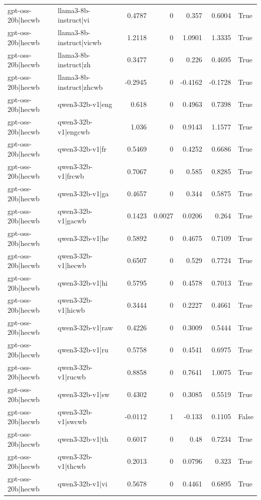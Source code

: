 \begin{table}
\begin{tabular}{l l r r r r l}
gpt-oss-20b|hecwb & llama3-8b-instruct|vi & 0.4787 & 0 & 0.357 & 0.6004 & True \\
gpt-oss-20b|hecwb & llama3-8b-instruct|vicwb & 1.2118 & 0 & 1.0901 & 1.3335 & True \\
gpt-oss-20b|hecwb & llama3-8b-instruct|zh & 0.3477 & 0 & 0.226 & 0.4695 & True \\
gpt-oss-20b|hecwb & llama3-8b-instruct|zhcwb & -0.2945 & 0 & -0.4162 & -0.1728 & True \\
gpt-oss-20b|hecwb & qwen3-32b-v1|eng & 0.618 & 0 & 0.4963 & 0.7398 & True \\
gpt-oss-20b|hecwb & qwen3-32b-v1|engcwb & 1.036 & 0 & 0.9143 & 1.1577 & True \\
gpt-oss-20b|hecwb & qwen3-32b-v1|fr & 0.5469 & 0 & 0.4252 & 0.6686 & True \\
gpt-oss-20b|hecwb & qwen3-32b-v1|frcwb & 0.7067 & 0 & 0.585 & 0.8285 & True \\
gpt-oss-20b|hecwb & qwen3-32b-v1|ga & 0.4657 & 0 & 0.344 & 0.5875 & True \\
gpt-oss-20b|hecwb & qwen3-32b-v1|gacwb & 0.1423 & 0.0027 & 0.0206 & 0.264 & True \\
gpt-oss-20b|hecwb & qwen3-32b-v1|he & 0.5892 & 0 & 0.4675 & 0.7109 & True \\
gpt-oss-20b|hecwb & qwen3-32b-v1|hecwb & 0.6507 & 0 & 0.529 & 0.7724 & True \\
gpt-oss-20b|hecwb & qwen3-32b-v1|hi & 0.5795 & 0 & 0.4578 & 0.7013 & True \\
gpt-oss-20b|hecwb & qwen3-32b-v1|hicwb & 0.3444 & 0 & 0.2227 & 0.4661 & True \\
gpt-oss-20b|hecwb & qwen3-32b-v1|raw & 0.4226 & 0 & 0.3009 & 0.5444 & True \\
gpt-oss-20b|hecwb & qwen3-32b-v1|ru & 0.5758 & 0 & 0.4541 & 0.6975 & True \\
gpt-oss-20b|hecwb & qwen3-32b-v1|rucwb & 0.8858 & 0 & 0.7641 & 1.0075 & True \\
gpt-oss-20b|hecwb & qwen3-32b-v1|sw & 0.4302 & 0 & 0.3085 & 0.5519 & True \\
gpt-oss-20b|hecwb & qwen3-32b-v1|swcwb & -0.0112 & 1 & -0.133 & 0.1105 & False \\
gpt-oss-20b|hecwb & qwen3-32b-v1|th & 0.6017 & 0 & 0.48 & 0.7234 & True \\
gpt-oss-20b|hecwb & qwen3-32b-v1|thcwb & 0.2013 & 0 & 0.0796 & 0.323 & True \\
gpt-oss-20b|hecwb & qwen3-32b-v1|vi & 0.5678 & 0 & 0.4461 & 0.6895 & True \\

\end{tabular}
\end{table}
